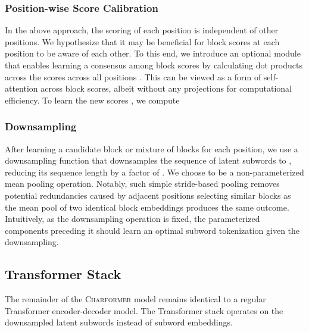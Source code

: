 \documentclass{article} \usepackage{iclr2022_conference,times}
\newcommand{\charformer}{\textsc{Charformer}\xspace}
\begin{document}
\subsubsection{Position-wise Score Calibration}
In the above approach, the scoring of each position is independent of other positions. We hypothesize that it may be beneficial for block scores at each position to be aware of each other. To this end, we introduce an optional module that enables learning a consensus among block scores by calculating dot products across the scores  across all positions . This can be viewed as a form of self-attention across block scores, albeit without any projections for computational efficiency. To learn the new scores , we compute 

\subsubsection{Downsampling}
After learning a candidate block or mixture of blocks for each position, we use a downsampling function  that downsamples the sequence of latent subwords  to , reducing its sequence length by a factor of .
We choose  to be a non-parameterized mean pooling operation. Notably, such simple stride-based pooling removes potential redundancies caused by adjacent positions selecting similar blocks as the mean pool of two identical block embeddings produces the same outcome. Intuitively, as the downsampling operation is fixed, the parameterized components preceding it should learn an optimal subword tokenization given the downsampling.

\subsection{Transformer Stack} \label{sec:transformer-stack}

The remainder of the \charformer model remains identical to a regular Transformer encoder-decoder model. The Transformer stack operates on the downsampled latent subwords  instead of subword embeddings. 
\end{document}
